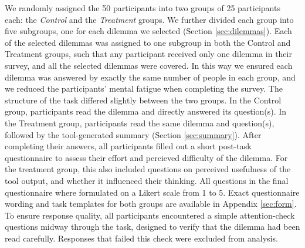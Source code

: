 We randomly assigned the 50 participants into two groups of 25 participants each: the \textit{Control} and the \textit{Treatment} groups.
We further divided each group into five subgroups, one for each dilemma we selected (Section \ref{sec:dilemmas}).
Each of the selected dilemmas was assigned to one subgroup in both the Control and Treatment groups, such that any participant received only one dilemma in their survey, and all the selected dilemmas were covered.
In this way we ensured each dilemma was answered by exactly the same number of people in each group, and we reduced the participants' mental fatigue when completing the survey.
The structure of the task differed slightly between the two groups.
In the Control group, participants read the dilemma and directly answered its question(s).
In the Treatment group, participants read the same dilemma and question(s), followed by the tool-generated summary (Section \ref{sec:summary}).
After completing their answers, all participants filled out a short post-task questionnaire to assess their effort and percieved difficulty of the dilemma.
For the treatment group, this also included questions on perceived usefulness of the tool output, and whether it influenced their thinking.
All questions in the final questionnaire where formulated on a Likert scale from 1 to 5.
Exact questionnaire wording and task templates for both groups are available in Appendix \ref{sec:form}.
To ensure response quality, all participants encountered a simple attention-check questions midway through the task, designed to verify that the dilemma had been read carefully. Responses that failed this check were excluded from analysis.
